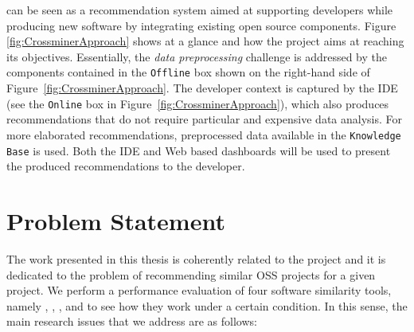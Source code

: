 \CROSSMINER can be seen as a recommendation system aimed at supporting developers while producing new software by integrating existing open source components. Figure \ref{fig:CrossminerApproach} shows \CROSSMINER at a glance and how the project aims at reaching its objectives. Essentially, the \textit{data preprocessing} challenge is addressed by the \CROSSMINER components contained in the \texttt{Offline} box shown on the right-hand side of Figure~\ref{fig:CrossminerApproach}. The developer context is captured by the IDE (see the \texttt{Online} box in Figure~\ref{fig:CrossminerApproach}), which also produces recommendations that do not require particular and expensive data analysis. For more elaborated recommendations, preprocessed data available in the \texttt{Knowledge Base} is used. Both the IDE and Web based dashboards will be used to present the produced recommendations to the developer. 


\section{Problem Statement}

The work presented in this thesis is coherently related to the \projectName project and it is dedicated to the problem of recommending similar OSS projects for a given project. We perform a performance evaluation of four software similarity tools, namely \MUDABlue \cite{10.1109/APSEC.2004.69}, \CLAN \cite{McMillan:2012:DSS:2337223.2337267}, \RepoPal \cite{10.1109/SANER.2017.7884605}, and \CrossSim \cite{NDRDSEAA2018} to see how they work under a certain condition. In this sense, the main research issues that we address are as follows:

